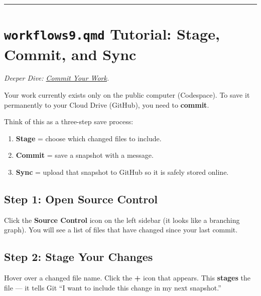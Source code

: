 \documentclass[
  letterpaper,
  DIV=11,
  numbers=noendperiod,
  oneside]{scrreprt}
\providecommand{\tightlist}{%
  \setlength{\itemsep}{0pt}\setlength{\parskip}{0pt}}
\begin{document}
\begin{center}\rule{0.5\linewidth}{0.5pt}\end{center}

\section*{\texorpdfstring{\texttt{workflows9.qmd} Tutorial: Stage,
Commit, and
Sync}{workflows9.qmd Tutorial: Stage, Commit, and Sync}}\label{workflows9.qmd-tutorial-stage-commit-and-sync}


\emph{Deeper Dive: \href{workflows08-commit-work.qmd}{Commit Your
Work}.}

Your work currently exists only on the public computer (Codespace). To
save it permanently to your Cloud Drive (GitHub), you need to
\textbf{commit}.

Think of this as a three-step save process:

\begin{enumerate}
\def\labelenumi{\arabic{enumi}.}
\tightlist
\item
  \textbf{Stage} = choose which changed files to include.
\item
  \textbf{Commit} = save a snapshot with a message.
\item
  \textbf{Sync} = upload that snapshot to GitHub so it is safely stored
  online.
\end{enumerate}

\subsection*{Step 1: Open Source
Control}\label{step-1-open-source-control}

Click the \textbf{Source Control} icon on the left sidebar (it looks
like a branching graph). You will see a list of files that have changed
since your last commit.

\subsection*{Step 2: Stage Your
Changes}\label{step-2-stage-your-changes}

Hover over a changed file name. Click the \textbf{+} icon that appears.
This \textbf{stages} the file --- it tells Git ``I want to include this
change in my next snapshot.''
\end{document}

